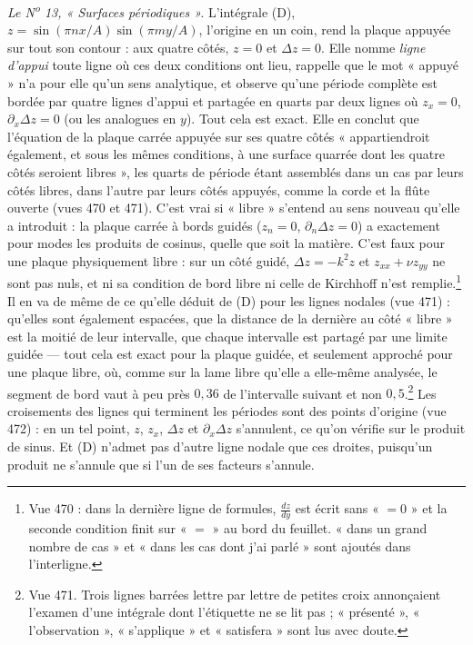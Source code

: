\documentclass[11pt,a4paper]{article}
\begin{document}
\emph{Le N\textsuperscript{o} 13, « Surfaces périodiques ».} L'intégrale (D),
$z = \sin(\pi n x/A)\sin(\pi m y/A)$, l'origine en un coin, rend la plaque appuyée sur
tout son contour : aux quatre côtés, $z = 0$ et $\Delta z = 0$. Elle nomme \emph{ligne
d'appui} toute ligne où ces deux conditions ont lieu, rappelle que le mot « appuyé »
n'a pour elle qu'un sens analytique, et observe qu'une période complète est bordée
par quatre lignes d'appui et partagée en quarts par deux lignes où
$z_x = 0$, $\partial_x\Delta z = 0$ (ou les analogues en $y$). Tout cela est exact.
Elle en conclut que l'équation de la plaque carrée appuyée sur ses quatre côtés
« appartiendroit également, et sous les mêmes conditions, à une surface quarrée dont
les quatre côtés seroient libres », les quarts de période étant assemblés dans un cas
par leurs côtés libres, dans l'autre par leurs côtés appuyés, comme la corde et la
flûte ouverte (vues 470 et 471). C'est vrai si « libre » s'entend au sens nouveau
qu'elle a introduit : la plaque carrée à bords guidés ($z_n = 0$,
$\partial_n\Delta z = 0$) a exactement pour modes les produits de cosinus, quelle que
soit la matière. C'est faux pour une plaque physiquement libre : sur un côté guidé,
$\Delta z = -k^2 z$ et $z_{xx} + \nu z_{yy}$ ne sont pas nuls, et ni sa condition de
bord libre ni celle de Kirchhoff n'est remplie.\footnote{Vue 470 : dans la dernière
ligne de formules, $\frac{dz}{dy}$ est écrit sans « $=0$ » et la seconde condition finit
sur « $=$ » au bord du feuillet. « dans un grand nombre de cas » et « dans les cas dont
j'ai parlé » sont ajoutés dans l'interligne.} Il en va de même de ce qu'elle déduit de
(D) pour les lignes nodales (vue 471) : qu'elles sont également espacées, que la
distance de la dernière au côté « libre » est la moitié de leur intervalle, que chaque
intervalle est partagé par une limite guidée — tout cela est exact pour la plaque
guidée, et seulement approché pour une plaque libre, où, comme sur la lame libre
qu'elle a elle-même analysée, le segment de bord vaut à peu près $0{,}36$ de
l'intervalle suivant et non $0{,}5$.\footnote{Vue 471. Trois lignes barrées lettre par
lettre de petites croix annonçaient l'examen d'une intégrale dont l'étiquette ne se lit
pas ; « présenté », « l'observation », « s'applique » et « satisfera » sont lus avec
doute.} Les croisements des lignes qui terminent les périodes sont des points
d'origine (vue 472) : en un tel point, $z$, $z_x$, $\Delta z$ et $\partial_x\Delta z$
s'annulent, ce qu'on vérifie sur le produit de sinus. Et (D) n'admet pas d'autre ligne
nodale que ces droites, puisqu'un produit ne s'annule que si l'un de ses facteurs
s'annule.
\end{document}
